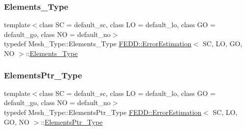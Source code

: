 \mbox{\label{classFEDD_1_1ErrorEstimation_ac074c6f1011aead7c9b786ab33b23978}} 
\subsubsection{\texorpdfstring{Elements\+\_\+\+Type}{Elements\_Type}}
{\footnotesize\ttfamily template$<$class SC = default\+\_\+sc, class LO = default\+\_\+lo, class GO = default\+\_\+go, class NO = default\+\_\+no$>$ \\
typedef Mesh\+\_\+\+Type\+::\+Elements\+\_\+\+Type \hyperlink{classFEDD_1_1ErrorEstimation}{F\+E\+D\+D\+::\+Error\+Estimation}$<$ SC, LO, GO, NO $>$\+::\hyperlink{classFEDD_1_1ErrorEstimation_ac074c6f1011aead7c9b786ab33b23978}{Elements\+\_\+\+Type}}

\mbox{\label{classFEDD_1_1ErrorEstimation_ae8e03ce6215a8a139c1c8e9d662030ce}} 
\subsubsection{\texorpdfstring{Elements\+Ptr\+\_\+\+Type}{ElementsPtr\_Type}}
{\footnotesize\ttfamily template$<$class SC = default\+\_\+sc, class LO = default\+\_\+lo, class GO = default\+\_\+go, class NO = default\+\_\+no$>$ \\
typedef Mesh\+\_\+\+Type\+::\+Elements\+Ptr\+\_\+\+Type \hyperlink{classFEDD_1_1ErrorEstimation}{F\+E\+D\+D\+::\+Error\+Estimation}$<$ SC, LO, GO, NO $>$\+::\hyperlink{classFEDD_1_1ErrorEstimation_ae8e03ce6215a8a139c1c8e9d662030ce}{Elements\+Ptr\+\_\+\+Type}}

\mbox{\label{classFEDD_1_1ErrorEstimation_a94d0ce98d9e797cc35769bda8d3ef9fc}} 
